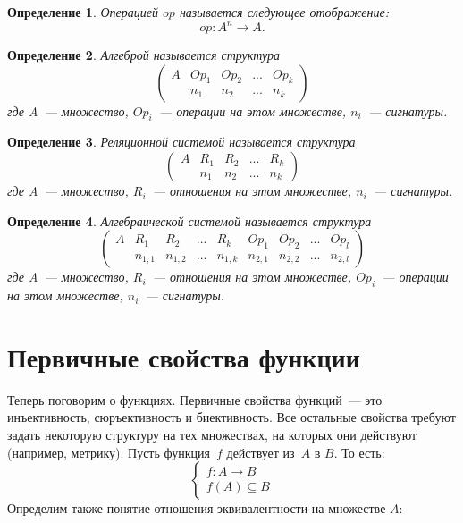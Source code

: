 \documentclass[a4paper, 12pt]{report}
\newtheorem{definition}{Определение}[chapter]
\begin{document}
\begin{definition}
Операцией $op$ называется следующее отображение:
\[
op: A^n \rightarrow A.
\]
\end{definition}

\begin{definition}
Алгеброй называется структура
\[
\begin{pmatrix}
A & Op_1 & Op_2 & ... & Op_k \\
    & n_1 & n_2 & ... & n_k
\end{pmatrix}
\]
где A~--- множество, $Op_i$~--- операции на этом множестве, $n_i$~--- сигнатуры.
\end{definition}

\begin{definition}
Реляционной системой называется структура
\[
\begin{pmatrix}
A & R_1 & R_2 & ... & R_k \\
  & n_1 & n_2 & ... & n_k
\end{pmatrix}
\]
где A~--- множество, $R_i$~--- отношения на этом множестве, $n_i$~--- сигнатуры.
\end{definition}

\begin{definition}
Алгебраической системой называется структура
\[
\begin{pmatrix}
A & R_1 & R_2 & ... & R_k & Op_1 & Op_2 & ... & Op_l \\
  & n_{1,1} & n_{1,2} & ... & n_{1,k} & n_{2,1} & n_{2,2} & ... & n_{2,l}
\end{pmatrix}
\]
где A~--- множество, $R_i$~--- отношения на этом множестве, $Op_i$~--- операции на этом множестве, $n_i$~--- сигнатуры.
\end{definition}

\section{Первичные свойства функции}
Теперь поговорим о функциях. Первичные свойства функций~--- это инъективность, сюръективность и биективность. Все остальные свойства требуют задать некоторую структуру на тех множествах, на которых они действуют (например, метрику).
Пусть функция~$f$ действует из~$A$ в $B$. То есть:
\[
\left\{
  \begin{array}{ll}
    f: A\rightarrow B\\
    f(A) \subseteq B
  \end{array}
\right.
\]
Определим также понятие отношения эквивалентности на множестве $A$:
\end{document}
